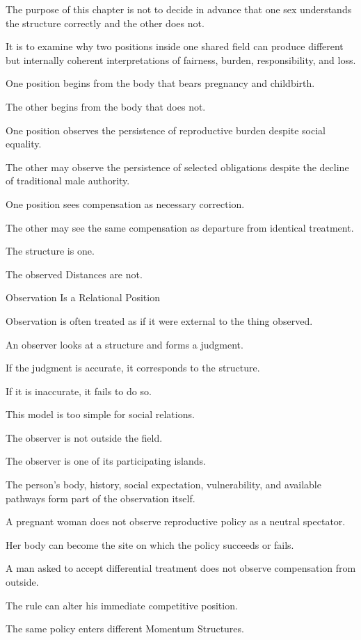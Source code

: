 The purpose of this chapter is not to decide in advance that one sex understands the structure correctly and the other does not.

It is to examine why two positions inside one shared field can produce different but internally coherent interpretations of fairness, burden, responsibility, and loss.

One position begins from the body that bears pregnancy and childbirth.

The other begins from the body that does not.

One position observes the persistence of reproductive burden despite social equality.

The other may observe the persistence of selected obligations despite the decline of traditional male authority.

One position sees compensation as necessary correction.

The other may see the same compensation as departure from identical treatment.

The structure is one.

The observed Distances are not.

Observation Is a Relational Position

Observation is often treated as if it were external to the thing observed.

An observer looks at a structure and forms a judgment.

If the judgment is accurate, it corresponds to the structure.

If it is inaccurate, it fails to do so.

This model is too simple for social relations.

The observer is not outside the field.

The observer is one of its participating islands.

The person’s body, history, social expectation, vulnerability, and available pathways form part of the observation itself.

A pregnant woman does not observe reproductive policy as a neutral spectator.

Her body can become the site on which the policy succeeds or fails.

A man asked to accept differential treatment does not observe compensation from outside.

The rule can alter his immediate competitive position.

The same policy enters different Momentum Structures.

